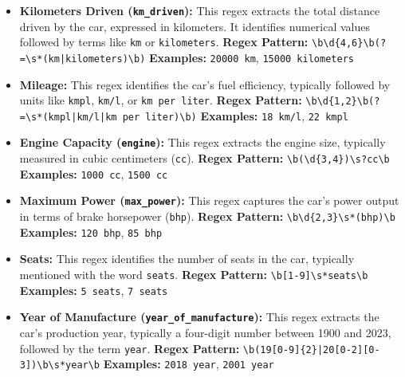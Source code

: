 \documentclass[a4paper,12pt]{article}
\begin{document}
\begin{itemize}
	\item \textbf{Kilometers Driven (\texttt{km\_driven}):} This regex extracts the total distance driven by the car, expressed in kilometers. It identifies numerical values followed by terms like \texttt{km} or \texttt{kilometers}.  
	\textbf{Regex Pattern:} \texttt{\textbackslash b\textbackslash d\{4,6\}\textbackslash b(?=\textbackslash s*(km|kilometers)\textbackslash b)}  
	\textbf{Examples:} \texttt{20000 km}, \texttt{15000 kilometers}
	
	\item \textbf{Mileage:} This regex identifies the car's fuel efficiency, typically followed by units like \texttt{kmpl}, \texttt{km/l}, or \texttt{km per liter}.  
	\textbf{Regex Pattern:} \texttt{\textbackslash b\textbackslash d\{1,2\}\textbackslash b(?=\textbackslash s*(kmpl|km/l|km per liter)\textbackslash b)}  
	\textbf{Examples:} \texttt{18 km/l}, \texttt{22 kmpl}
	
	\item \textbf{Engine Capacity (\texttt{engine}):} This regex extracts the engine size, typically measured in cubic centimeters (\texttt{cc}).  
	\textbf{Regex Pattern:} \texttt{\textbackslash b(\textbackslash d\{3,4\})\textbackslash s?cc\textbackslash b}  
	\textbf{Examples:} \texttt{1000 cc}, \texttt{1500 cc}
	
	\item \textbf{Maximum Power (\texttt{max\_power}):} This regex captures the car's power output in terms of brake horsepower (\texttt{bhp}).  
	\textbf{Regex Pattern:} \texttt{\textbackslash b\textbackslash d\{2,3\}\textbackslash s*(bhp)\textbackslash b}  
	\textbf{Examples:} \texttt{120 bhp}, \texttt{85 bhp}
	
	\item \textbf{Seats:} This regex identifies the number of seats in the car, typically mentioned with the word \texttt{seats}.  
	\textbf{Regex Pattern:} \texttt{\textbackslash b[1-9]\textbackslash s*seats\textbackslash b}  
	\textbf{Examples:} \texttt{5 seats}, \texttt{7 seats}
	
	\item \textbf{Year of Manufacture (\texttt{year\_of\_manufacture}):} This regex extracts the car's production year, typically a four-digit number between 1900 and 2023, followed by the term \texttt{year}.  
	\textbf{Regex Pattern:} \texttt{\textbackslash b(19[0-9]\{2\}|20[0-2][0-3])\textbackslash b\textbackslash s*year\textbackslash b}  
	\textbf{Examples:} \texttt{2018 year}, \texttt{2001 year}
\end{itemize}
\end{document}
